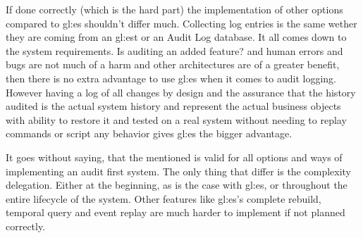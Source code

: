 If done correctly (which is the hard part) the implementation of other options compared to \gls{gl:es} shouldn't differ much. Collecting log entries is the same wether they are coming from an \gls{gl:est} or an Audit Log database. It all comes down to the system requirements. Is auditing an added feature? and human errors and bugs are not much of a harm and other architectures are of a greater benefit, then there is no extra advantage to use \gls{gl:es} when it comes to audit logging. However having a log of all changes by design and the assurance that the history audited is the actual system history and represent the actual business objects with ability to restore it and tested on a real system without needing to replay commands or script any behavior gives \gls{gl:es} the bigger advantage. 

It goes without saying, that the mentioned is valid for all options and ways of implementing an audit first system. The only thing that differ is the complexity delegation. Either at the beginning, as is the case with \gls{gl:es}, or throughout the entire lifecycle of the system. Other features like \gls{gl:es}'s complete rebuild, temporal query and event replay are much harder to implement if not planned correctly.